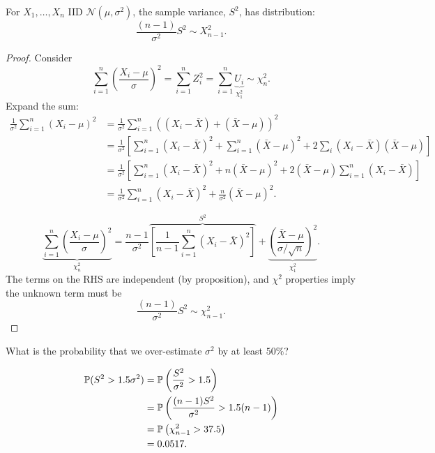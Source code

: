 \documentclass[10pt, a4paper]{article}
\begin{document}
\begin{proposition}
    For $X_1, \dotsc, X_n$ IID $\mathcal{N}(\mu, \sigma ^ 2)$,
    the sample variance,
    $S ^ 2$,
    has distribution:
    \[
    \frac{(n - 1)}{\sigma ^ 2}S ^ 2 \sim X_{n - 1}^{2}.
    \]

    \begin{proof}
        Consider
        \begin{equation}\label{statsinfII:eq:2}\tag{*}
            \sum_{i = 1}^{n}\left(\frac{X_i - \mu}{\sigma}\right) ^ 2 = \sum_{i = 1}^{n}Z_i ^ 2 = \sum_{i = 1}^{n}\underbrace{U_i}_{\chi_{1}^{2}} \sim \chi_{n}^{2}.
        \end{equation}
        Expand the sum:
        \begin{align*}
            \frac{1}{\sigma ^ 2}\sum_{i = 1}^{n}(X_i - \mu) ^ 2 &= \frac{1}{\sigma ^ 2}\sum_{i = 1}^{n}\left((X_i - \bar{X}) + (\bar{X} - \mu)\right) ^ 2 \\
            &= \frac{1}{\sigma ^ 2}\left[\sum_{i = 1}^{n}(X_i - \bar{X}) ^ 2 + \sum_{i = 1}^{n}(\bar{X} - \mu) ^ 2 + 2\sum_{i}(X_i - \bar{X})(\bar{X} - \mu)\right] \\
            &= \frac{1}{\sigma ^ 2}\left[\sum_{i = 1}^{n}(X_i - \bar{X}) ^ 2 + n(\bar{X} - \mu) ^ 2 + 2(\bar{X} - \mu)\sum_{i = 1}^{n}(X_i - \bar{X})\right] \\
            &= \frac{1}{\sigma ^ 2}\sum_{i = 1}^{n}(X_i - \bar{X}) ^ 2 + \frac{n}{\sigma ^ 2}(\bar{X} - \mu) ^ 2.
        \end{align*}

        \[
        \underbrace{\sum_{i = 1}^{n}\left(\frac{X_i - \mu}{\sigma}\right) ^ 2}_{\chi_{n}^{2}} = \frac{n - 1}{\sigma ^ 2}\overbrace{\left[\frac{1}{n - 1}\sum_{i = 1}^{n}(X_i - \bar{X}) ^ 2\right]}^{S ^ 2} + \underbrace{\left(\frac{\bar{X} - \mu}{\sigma / \sqrt{n}}\right) ^ 2}_{\chi_{1}^{2}}.
        \]
        The terms on the RHS are independent
        (by proposition),
        and $\chi ^ 2$ properties imply the unknown term must be
        \[
        \frac{(n - 1)}{\sigma ^ 2}S ^ 2 \sim \chi_{n - 1}^{2}.
        \]
    \end{proof}
\end{proposition}

\begin{example}
    What is the probability that we over-estimate $\sigma ^ 2$ by at least $50\%$?

    \begin{align*}
        \P(S ^ 2 > 1.5\sigma ^ 2) &= \P\left(\frac{S ^ 2}{\sigma ^ 2} > 1.5\right) \\
        &= \P\left(\frac{(n - 1)S ^ 2}{\sigma ^ 2} > 1.5(n - 1)\right) \\
        &= \P\left(\chi_{n - 1}^{2} > 37.5\right) \\
        &= 0.0517.
    \end{align*}
\end{example}
\end{document}
